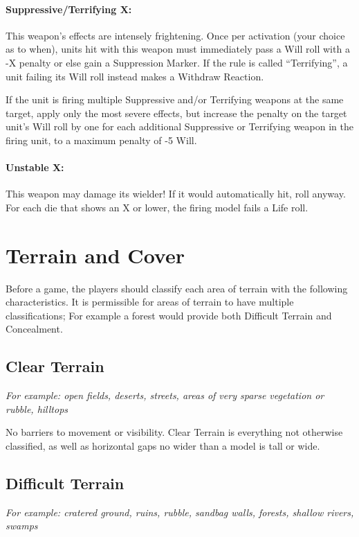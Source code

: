 \begin{multicols}{2}
\subsubsection*{Suppressive/Terrifying X:} This weapon's effects are intensely frightening. Once per activation (your choice as to when), units hit with this weapon must immediately pass a Will roll with a -X penalty or else gain a Suppression Marker. If the rule is called ``Terrifying'', a unit failing its Will roll instead makes a Withdraw Reaction.

If the unit is firing multiple Suppressive and/or Terrifying weapons at the same target, apply only the most severe effects, but increase the penalty on the target unit's Will roll by one for each additional Suppressive or Terrifying weapon in the firing unit, to a maximum penalty of -5 Will.

\subsubsection*{Unstable X:} This weapon may damage its wielder! If it would automatically hit, roll anyway. For each die that shows an X or lower, the firing model fails a Life roll.




\chapter*{Terrain and Cover}

Before a game, the players should classify each area of terrain with the following characteristics. It is permissible for areas of terrain to have multiple classifications; For example a forest would provide both Difficult Terrain and Concealment.




\section*{Clear Terrain}
\textit{For example: open fields, deserts, streets, areas of very sparse vegetation or rubble, hilltops}

No barriers to movement or visibility. Clear Terrain is everything not otherwise classified, as well as horizontal gaps no wider than a model is tall or wide.




\section*{Difficult Terrain}
\textit{For example: cratered ground, ruins, rubble, sandbag walls, forests, shallow rivers, swamps}


\end{multicols}
